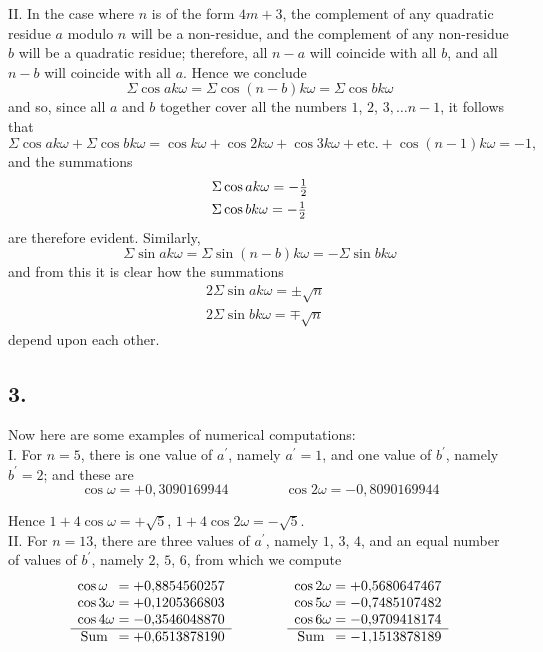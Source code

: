 \documentclass[twoside,12pt]{memoir}
\let\oldfrac\frac
\def\frac#1#2{\mathchoice{\tfrac{#1}{#2}}{\oldfrac{#1}{#2}}{\genfrac{}{}{}{2}{#1}{#2\mathstrut}}{\genfrac{}{}{}{3}{#1}{#2\mathstrut}}}
\begin{document}
II. In the case where \(n\) is of the form \(4m+3\), the complement of any quadratic residue \(a\) modulo \(n\) will be a non-residue, and the complement of any non-residue \(b\) will be a quadratic residue; therefore, all \(n-a\) will coincide with all \(b\), and all \(n-b\) will coincide with all \(a\). Hence we conclude
\[\Sigma \cos a k \omega=\Sigma \cos (n-b) k \omega=\Sigma \cos b k \omega\]
and so, since all \(a\) and \(b\) together cover all the numbers \(1\), \(2\), \(3, \ldots n-1\), it follows that 
\[\Sigma \cos a k \omega+\Sigma \cos b k \omega=\cos k \omega+\cos 2 k \omega+\cos 3 k \omega+\text{etc{.}}+\cos (n-1) k \omega=-1,\]
and the summations
\[\begin{aligned}
& \Sigma \cos a k \omega=-\frac{1}{2} \\
& \Sigma \cos b k \omega=-\frac{1}{2}
\end{aligned}\]
are therefore evident. Similarly,
\[\Sigma \sin a k \omega=\Sigma \sin (n-b) k \omega=-\Sigma \sin b k \omega\]\pagebreak%
and from this it is clear how the summations
\[\begin{aligned}
& 2\Sigma \sin a k \omega= \pm \sqrt{n} \\
& 2\Sigma \sin b k \omega= \mp \sqrt{n}
\end{aligned}\]
depend upon each other.

\subsection*{3.}

Now here are some examples of numerical computations:\\

I. For \(n=5\), there is one value of \(a^{\prime}\), namely \(a^{\prime}=1\), and one value of \(b^{\prime}\), namely \(b^{\prime}=2\); and these are
\[\cos \omega=+0{,}3090169944 \qquad \qquad \cos 2 \omega=-0{,}8090169944\]

Hence \(1+4 \cos \omega=+\surd 5\), \(1+4 \cos 2 \omega=-\surd 5\).\\

II. For \(n=13\), there are three values of \(a^{\prime}\), namely \(1\), \(3\), \(4\), and an equal number of values of \(b^{\prime}\), namely \(2\), \(5\), \(6\), from which we compute
\[ \begin{array}{r} 
\cos \omega\phantom{1} = + 0{,}8854560257 \\ 
\cos 3\omega = + 0{,}1205366803 \\ 
\cos 4 \omega = - 0{,}3546048870 \\ 
\hline \text{Sum\phantom{a}} = + 0{,}6513878190 \end{array} 
\qquad \qquad
\begin{array}{r} 
\cos 2\omega = + 0{,}5680647467 \\ 
\cos 5\omega = - 0{,}7485107482 \\ 
\cos 6 \omega = - 0{,}9709418174 \\ 
\hline \text{Sum\phantom{a}} = - 1{,}1513878189 \end{array} \]
 
\end{document}

